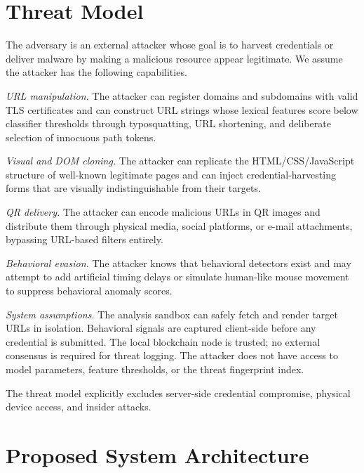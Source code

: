 \documentclass[conference]{IEEEtran}
\begin{document}
\section{Threat Model}

The adversary is an external attacker whose goal is to harvest credentials or deliver malware
by making a malicious resource appear legitimate.
We assume the attacker has the following capabilities.

\noindent\textit{URL manipulation.}
The attacker can register domains and subdomains with valid TLS certificates and can construct
URL strings whose lexical features score below classifier thresholds through typosquatting,
URL shortening, and deliberate selection of innocuous path tokens.

\noindent\textit{Visual and DOM cloning.}
The attacker can replicate the HTML/CSS/JavaScript structure of well-known legitimate pages and
can inject credential-harvesting forms that are visually indistinguishable from their targets.

\noindent\textit{QR delivery.}
The attacker can encode malicious URLs in QR images and distribute them through physical media,
social platforms, or e-mail attachments, bypassing URL-based filters entirely.

\noindent\textit{Behavioral evasion.}
The attacker knows that behavioral detectors exist and may attempt to add artificial timing delays
or simulate human-like mouse movement to suppress behavioral anomaly scores.

\noindent\textit{System assumptions.}
The analysis sandbox can safely fetch and render target URLs in isolation.
Behavioral signals are captured client-side before any credential is submitted.
The local blockchain node is trusted; no external consensus is required for threat logging.
The attacker does not have access to model parameters, feature thresholds, or the threat
fingerprint index.

The threat model explicitly excludes server-side credential compromise, physical device access,
and insider attacks.

\section{Proposed System Architecture}
\end{document}
